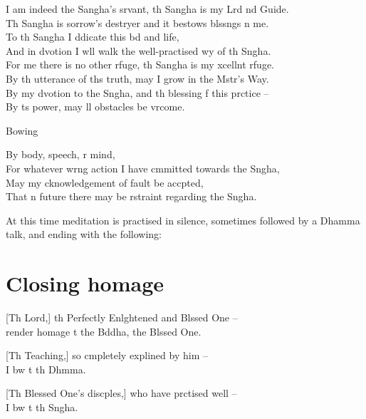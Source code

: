 \clearpage

I am indeed the Sangha's srvant, th Sangha is my Lrd nd Guide.\\%
Th Sangha is sorrow's destryer and it bestows blssngs n me.\\
To th Sangha I ddicate this bd and life,\\
And in dvotion I wll walk the well-practised wy of th Sngha.\\
For me there is no other rfuge, th Sangha is my xcellnt rfuge.\\
By th utterance of ths truth, may I grow in the Mstr's Way.\\
By my dvotion to the Sngha, and th blessing f this prctice --\\
By ts power, may ll obstacles be vrcome.

\begin{instruction}
  Bowing
\end{instruction}

By body, speech, r mind,\\
For whatever wrng action I have cmmitted towards the Sngha,\\
May my cknowledgement of fault be accpted,\\
That n future there may be rstraint regarding the Sngha.

\vfill

\begin{instruction}
  At this time meditation is practised in silence, sometimes followed by a Dhamma talk, and ending with the following:
\end{instruction}

\chapter{Closing homage}%

[Th Lord,] th Perfectly Enlghtened and Blssed One --\\
 render homage t the Bddha, the Blssed One. 

[Th Teaching,] so cmpletely explined by him --\\
I bw t th Dhmma. 

[Th Blessed One's discples,] who have prctised well --\\
I bw t th Sngha. 



